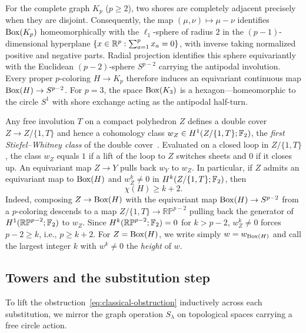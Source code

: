 For the complete graph $K_p$ ($p\ge2$), two shores are completely adjacent precisely when they are disjoint. Consequently, the map $(\mu,\nu)\mapsto\mu-\nu$ identifies $\operatorname{Box}(K_p)$ homeomorphically with the $\ell_1$-sphere of radius $2$ in the $(p-1)$-dimensional hyperplane $\{x\in\mathbb R^p:\sum_{a=1}^p x_a=0\}$, with inverse taking normalized positive and negative parts. Radial projection identifies this sphere equivariantly with the Euclidean $(p-2)$-sphere $S^{p-2}$ carrying the antipodal involution. Every proper $p$-coloring $H\to K_p$ therefore induces an equivariant continuous map $\operatorname{Box}(H)\to S^{p-2}$. For $p=3$, the space $\operatorname{Box}(K_3)$ is a hexagon---homeomorphic to the circle $S^1$ with shore exchange acting as the antipodal half-turn.

Any free involution $T$ on a compact polyhedron $Z$ defines a double cover $Z\to Z/\{1,T\}$ and hence a cohomology class $w_Z\in H^1(Z/\{1,T\};\mathbb F_2)$, the \emph{first Stiefel--Whitney class} of the double cover~\cite{MS}. Evaluated on a closed loop in $Z/\{1,T\}$, the class $w_Z$ equals $1$ if a lift of the loop to $Z$ switches sheets and $0$ if it closes up. An equivariant map $Z\to Y$ pulls back $w_Y$ to $w_Z$. In particular, if $Z$ admits an equivariant map to $\operatorname{Box}(H)$ and $w_Z^k\ne0$ in $H^k(Z/\{1,T\};\mathbb F_2)$, then
\begin{equation}\label{eq:classical-obstruction}
 \chi(H)\ge k+2.
\end{equation}
Indeed, composing $Z\to\operatorname{Box}(H)$ with the equivariant map $\operatorname{Box}(H)\to S^{p-2}$ from a $p$-coloring descends to a map $Z/\{1,T\}\to\mathbb{RP}^{p-2}$ pulling back the generator of $H^1(\mathbb{RP}^{p-2};\mathbb F_2)$ to $w_Z$. Since $H^k(\mathbb{RP}^{p-2};\mathbb F_2)=0$ for $k>p-2$, $w_Z^k\ne0$ forces $p-2\ge k$, i.e., $p\ge k+2$. For $Z=\operatorname{Box}(H)$, we write simply $w=w_{\operatorname{Box}(H)}$ and call the largest integer $k$ with $w^k\ne0$ the \emph{height} of $w$.

\subsection{Towers and the substitution step}\label{sec:towers}

To lift the obstruction~\eqref{eq:classical-obstruction} inductively across each substitution, we mirror the graph operation $S_\lambda$ on topological spaces carrying a free circle action.

